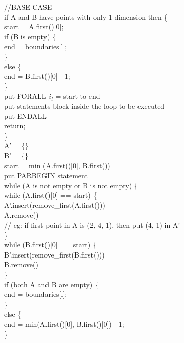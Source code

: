 \indent	//BASE CASE \\
\indent	if A and B have points with only 1 dimension then \{ \\
\indent \indent		start = A.first()[0]; \\
\indent \indent		if (B is empty) \{ \\
\indent\indent	 \indent		end = boundaries[l]; \\
\indent \indent		\} \\
\indent \indent		else \{ \\
\indent\indent	 \indent		end = B.first()[0] - 1; \\
\indent \indent		\} \\
\indent \indent		put FORALL $i_l$ = start to end \\
\indent \indent		put statements block inside the loop to be executed \\
\indent \indent		put ENDALL \\

\indent \indent		return; \\
\indent	\} \\
	
\indent	A' = \{\} \\
\indent	B' = \{\} \\
\indent	start = min (A.first()[0], B.first()) \\

\indent put PARBEGIN statement\\
	
\indent	while (A is not empty or B is not empty) \{ \\
		
\indent\indent		while (A.first()[0] == start) \{ \\
\indent\indent\indent			A'.insert(remove\_first(A.first())) \\
\indent\indent\indent			A.remove() \\
\indent\indent\indent			// eg: if first point in A is (2, 4, 1), then put (4, 1) in A' \\
\indent\indent		\} \\
\indent\indent		while (B.first()[0] == start) \{ \\
\indent\indent\indent			B'.insert(remove\_first(B.first())) \\
\indent\indent\indent			B.remove() \\
\indent\indent		\} \\

\indent\indent		if (both A and B are empty) \{ \\
\indent\indent\indent			end = boundaries[l]; \\
\indent\indent		\} \\
\indent\indent		else \{ \\
\indent\indent\indent			end = min(A.first()[0], B.first()[0]) - 1; \\
\indent\indent		\} \\

